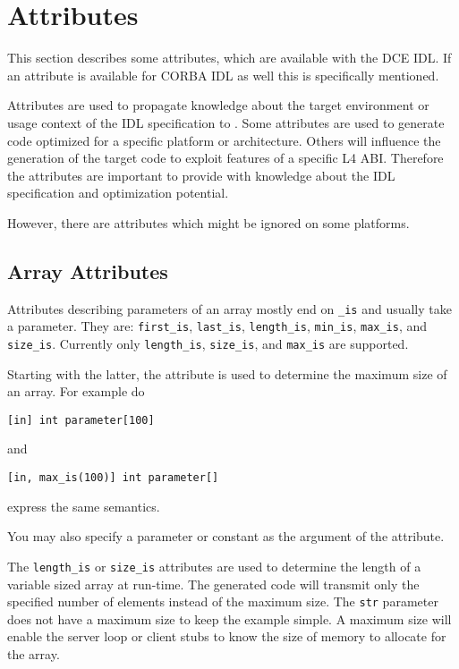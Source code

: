 \section{Attributes}
\label{sec:attributes}

This section describes some attributes, which are available
with the DCE IDL. If an attribute is available for CORBA IDL as well
this is specifically mentioned.

Attributes are used to propagate knowledge about the target
environment or usage context of the IDL specification to \dice{}.
Some attributes are used to generate code optimized for a
specific platform or architecture. Others will influence the
generation of the target code to exploit features of a specific 
L4 ABI. Therefore the attributes are important to provide
\dice{} with knowledge about the IDL specification and optimization
potential.

However, there are attributes which might be ignored on some platforms.

\subsection{Array Attributes}
Attributes describing parameters of an array mostly end on
\verb|_is| and usually take a parameter. They are:
\verb|first_is|, \verb|last_is|, \verb|length_is|, \verb|min_is|,
\verb|max_is|, and \verb|size_is|. Currently only \verb|length_is|,
\verb|size_is|, and \verb|max_is| are supported.

Starting with the latter, the attribute is used to determine
the maximum size of an array. For example do
\begin{verbatim}
[in] int parameter[100]
\end{verbatim}
and
\begin{verbatim}
[in, max_is(100)] int parameter[]
\end{verbatim}
express the same semantics.

You may also specify a parameter or constant as the 
argument of the attribute.

The \verb|length_is| or \verb|size_is| attributes are used
to determine the length of a variable sized array at run-time.
The generated code will transmit only the specified number of
elements instead of the maximum size. The \verb|str| parameter
does not have a maximum size to keep the example simple. A maximum
size will enable the server loop or client stubs to know the
size of memory to allocate for the array.

